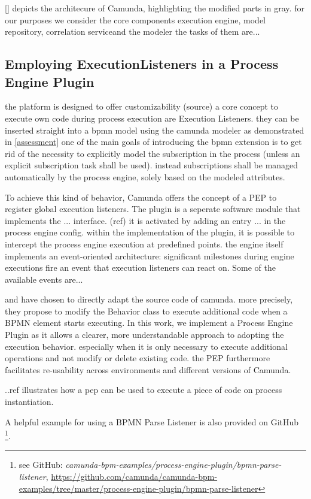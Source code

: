 
\autoref{} depicts the architecure of Camunda, highlighting the modified parts in gray.
for our purposes we consider the core components execution engine, model repository, correlation serviceand the modeler
the tasks of them are...

\subsection{Employing ExecutionListeners in a Process Engine Plugin}
the platform is designed to offer customizability (source)
a core concept to execute own code during process execution are Execution Listeners.
they can be inserted straight into a bpmn model using the camunda modeler as demonstrated in \autoref{assessment}
one of the main goals of introducing the bpmn extension is to get rid of the necessity to explicitly model the subscription in the process (unless an explicit subscription task shall be used).
instead subscriptions shall be managed automatically by the process engine, solely based on the modeled attributes.

To achieve this kind of behavior, Camunda offers the concept of a \ac{PEP} to register global execution listeners.
The plugin is a seperate software module that implements the ... interface. (ref)
it is activated by adding an entry ... in the process engine config.
within the implementation of the plugin, it is possible to intercept the process engine execution at predefined points.
the engine itself implements an event-oriented architecture: significant milestones during engine executions fire an event that execution listeners can react on.
Some of the available events are...

\cite{mandal:2017} and \cite{Pufahl2017} have chosen to directly adapt the source code of camunda. more precisely, they propose to modify the Behavior class to execute additional code when a BPMN element starts executing.
In this work, we implement a Process Engine Plugin as it allows a clearer, more understandable approach to adopting the execution behavior. especially when it is only necessary to execute additional operations and not modify or delete existing code.
the PEP furthermore facilitates re-usability across environments and different versions of Camunda.

..ref illustrates how a pep can be used to execute a piece of code on process instantiation.

A helpful example for using a BPMN Parse Listener is also provided on GitHub
\footnote{see GitHub: \textit{camunda-bpm-examples/process-engine-plugin/bpmn-parse-listener}, \url{https://github.com/camunda/camunda-bpm-examples/tree/master/process-engine-plugin/bpmn-parse-listener}}.

